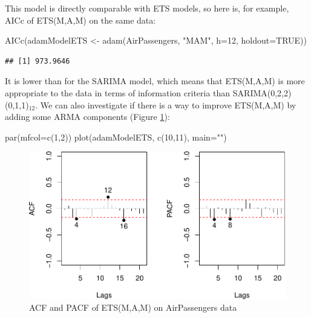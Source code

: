 \documentclass[
]{book}
\newenvironment{Shaded}{\begin{snugshade}}{\end{snugshade}}
\newcommand{\AttributeTok}[1]{\textcolor[rgb]{0.77,0.63,0.00}{#1}}
\newcommand{\ConstantTok}[1]{\textcolor[rgb]{0.00,0.00,0.00}{#1}}
\newcommand{\DecValTok}[1]{\textcolor[rgb]{0.00,0.00,0.81}{#1}}
\newcommand{\FunctionTok}[1]{\textcolor[rgb]{0.00,0.00,0.00}{#1}}
\newcommand{\NormalTok}[1]{#1}
\newcommand{\OtherTok}[1]{\textcolor[rgb]{0.56,0.35,0.01}{#1}}
\newcommand{\StringTok}[1]{\textcolor[rgb]{0.31,0.60,0.02}{#1}}
\theoremstyle{definition}
\theoremstyle{definition}
\theoremstyle{definition}
\theoremstyle{definition}
\theoremstyle{remark}
\begin{document}
This model is directly comparable with ETS models, so here is, for example, AICc of ETS(M,A,M) on the same data:

\begin{Shaded}
\begin{Highlighting}[]
\FunctionTok{AICc}\NormalTok{(adamModelETS }\OtherTok{\textless{}{-}} \FunctionTok{adam}\NormalTok{(AirPassengers, }\StringTok{"MAM"}\NormalTok{,}
                          \AttributeTok{h=}\DecValTok{12}\NormalTok{, }\AttributeTok{holdout=}\ConstantTok{TRUE}\NormalTok{))}
\end{Highlighting}
\end{Shaded}

\begin{verbatim}
## [1] 973.9646
\end{verbatim}

It is lower than for the SARIMA model, which means that ETS(M,A,M) is more appropriate to the data in terms of information criteria than SARIMA(0,2,2)(0,1,1)\(_{12}\). We can also investigate if there is a way to improve ETS(M,A,M) by adding some ARMA components (Figure \ref{fig:adamETSPlotAirACFPACF}):

\begin{Shaded}
\begin{Highlighting}[]
\FunctionTok{par}\NormalTok{(}\AttributeTok{mfcol=}\FunctionTok{c}\NormalTok{(}\DecValTok{1}\NormalTok{,}\DecValTok{2}\NormalTok{))}
\FunctionTok{plot}\NormalTok{(adamModelETS, }\FunctionTok{c}\NormalTok{(}\DecValTok{10}\NormalTok{,}\DecValTok{11}\NormalTok{), }\AttributeTok{main=}\StringTok{""}\NormalTok{)}
\end{Highlighting}
\end{Shaded}

\begin{figure}
\centering
\includegraphics{Svetunkov--2022----ADAM_files/figure-latex/adamETSPlotAirACFPACF-1.pdf}
\caption{\label{fig:adamETSPlotAirACFPACF}ACF and PACF of ETS(M,A,M) on AirPassengers data}
\end{figure}
\end{document}

